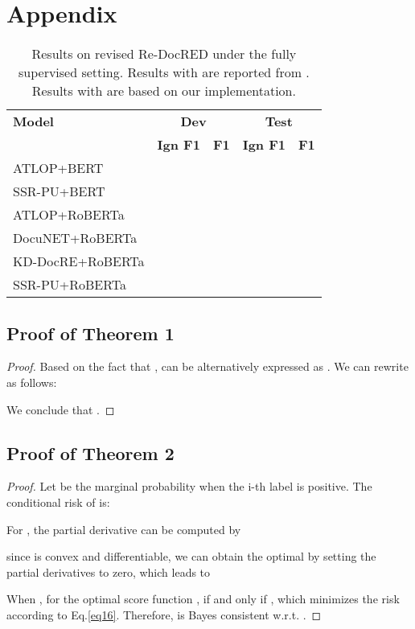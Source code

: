 \documentclass[11pt]{article}
\begin{document}
\appendix

\section{Appendix}
\label{sec:appendix}

\begin{table*}
\centering
\begin{tabular}{lcccc}
\hline \textbf{Model} & \multicolumn{2}{c}{\textbf{Dev}} & \multicolumn{2}{c}{\textbf{Test}} \\
& \textbf{Ign F1} & \textbf{F1} & \textbf{Ign F1} & \textbf{F1} \\
\hline ATLOP+BERT &  &  &  &  \\
SSR-PU+BERT &  &  &  &  \\
\hline ATLOP+RoBERTa &  &  &  &  \\
DocuNET+RoBERTa &  &  &  &  \\
KD-DocRE+RoBERTa &  &  &  &  \\
SSR-PU+RoBERTa &  &  &  &  \\
\hline
\end{tabular}
\caption{\label{table_full}
Results on revised Re-DocRED under the fully supervised setting. Results with  are reported from \citep{tan2022revisiting}. Results with  are based on our implementation.
}
\end{table*}

\subsection{Proof of Theorem 1}
\label{a0}
\begin{proof}
Based on the fact that  ,  can be alternatively expressed as . We can rewrite  as follows:

We conclude that .
\end{proof}

\subsection{Proof of Theorem 2}
\label{a1}
\begin{proof}
Let  be the marginal probability when the i-th label is positive. The conditional risk of  is:

For , the partial derivative can be computed by

since  is convex and differentiable, we can obtain the optimal  by setting the partial derivatives to zero, which leads to

When , for the optimal score function ,  if and only if , which minimizes the  risk according to Eq.\ref{eq16}. Therefore,  is Bayes consistent w.r.t. .
\end{proof}
\end{document}
